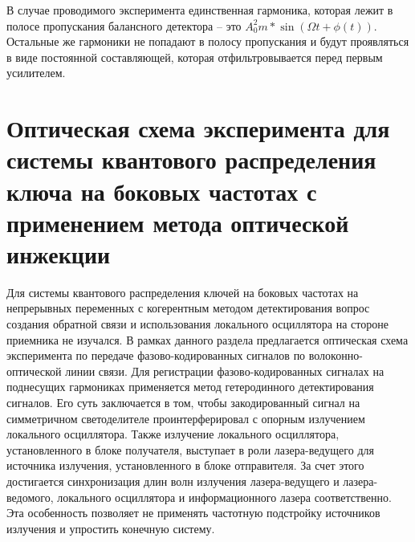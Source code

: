 В случае проводимого эксперимента единственная гармоника, которая лежит в полосе пропускания балансного детектора -- это $A_0^2m*\sin(\Omega t   + \phi (t))$.
Остальные же гармоники не попадают в полосу пропускания и будут проявляться в виде постоянной составляющей, которая отфильтровывается перед первым усилителем. 

\section{Оптическая схема эксперимента для системы квантового распределения ключа на боковых частотах с применением метода оптической инжекции}\label{sec:ch2/sect4}
Для системы квантового распределения ключей на боковых частотах на непрерывных переменных с когерентным методом детектирования вопрос создания обратной связи и использования локального осциллятора на стороне приемника не изучался. В рамках данного раздела предлагается оптическая схема эксперимента по передаче фазово-кодированных сигналов по волоконно-оптической линии связи. Для регистрации фазово-кодированных сигналах на поднесущих гармониках применяется метод гетеродинного детектирования сигналов. Его суть заключается в том, чтобы закодированный сигнал на симметричном светоделителе проинтерферировал с опорным излучением локального осциллятора. Также излучение локального осциллятора, установленного в блоке получателя, выступает в роли лазера-ведущего для источника излучения, установленного в блоке отправителя. За счет этого достигается синхронизация длин волн излучения лазера-ведущего и лазера-ведомого, локального осциллятора и информационного лазера соответственно. Эта особенность позволяет не применять частотную подстройку источников излучения и упростить конечную систему.

